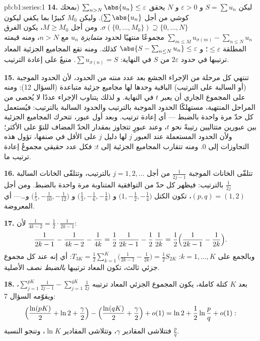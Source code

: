 \begin{solution}{pb:b1:series:1}
\textbf{14.} ليكن $S = \sum u_n$ و $\varepsilon > 0$ و $N$ يحقق
$\sum_{n > N} \abs{u_n} \leq \varepsilon$ (بمحك كوشي من أجل
$\sum\abs{u_n}$). وليكن $M_0$ كبيرًا بما يكفي ليكون $\sigma(\{0,
\dots, M_0\}) \supseteq \{0, \dots, N\}$. ومن أجل $M \geq M_0$، يكون
الفرق $\sum_{m \leq M} u_{\sigma(m)} - \sum_{n \leq N} u_n$
مجموعًا منتهيًا لحدود \emph{متمايزة} $u_n$ مع $n > N$،
ومنه قيمته المطلقة $\leq \varepsilon$؛ و $\abs{S -
\sum_{n\leq N} u_n} \leq \varepsilon$ كذلك. ومنه تقع المجاميع الجزئية
المعاد ترتيبها في حدود $2\varepsilon$ من $S$ في النهاية:
$\sum u_{\sigma(n)} = S$. 
منيعٌ على إعادة الترتيب.

\textbf{15.} تنتهي كل مرحلة من الإجراء الجشع بعد
عدد منته من الحدود، لأن الحدود الموجبة (أو السالبة على
الترتيب) الباقية وحدها لها مجاميع جزئية متباعدة
(السؤال 12): ومنه على المجموع الجاري أن يعبر $t$ في النهاية. و
لذلك يتناوب الإجراء عددًا لا يُحصى من المراحل المنتهية،
مستهلكًا الحدود الموجبة بالترتيب والحدود السالبة
بالترتيب: فيُستعمل كل حدّ مرة واحدة بالضبط --- أي إعادة ترتيب.
وبعد أول عبور، تتحرك المجاميع الجزئية بين عبورين متتاليين
رتيبةً نحو $t$، وعند عبورٍ
تتجاوز بمقدار الحدّ المضاف للتوّ على الأكثر؛ ولأن الحدود
المستعملة عند العبور $j$ لها دليل $j$ على الأقل في
صنفها، تؤول هذه التجاوزات إلى $0$. ومنه تتقارب المجاميع الجزئية
إلى $t$: فكل عدد حقيقي مجموعُ إعادة ترتيب
ما.

\textbf{16.} تتلقّى الخانات الموجبة $\frac{1}{2j-1}$ من أجل
$j = 1, 2, \dots$ بالترتيب، وتتلقّى الخانات السالبة $\frac{1}{2j}$
بالترتيب: فيظهر كل حدّ من  التوافقية المتناوبة
مرة واحدة بالضبط. ومن أجل $(p, q) = (1, 2)$، تكون الكتل
$\bigl(1, -\frac12, -\frac14\bigr)$ و $\bigl(\frac13, -\frac16,
-\frac18\bigr)$ و $\bigl(\frac15, -\frac1{10},
-\frac1{12}\bigr)$ و\dots --- أي  المعروضة.

\textbf{17.} لأن $\frac{1}{4k-2} = \frac12\cdot\frac{1}{2k-1}$:
\[
\frac{1}{2k-1} - \frac{1}{4k-2} - \frac{1}{4k}
= \frac12\,\frac{1}{2k-1} - \frac12\,\frac{1}{2k}
= \frac12\Bigl(\frac{1}{2k-1} - \frac{1}{2k}\Bigr).
\]
وبالجمع على $k = 1, \dots, K$: $T_{3K} = \frac12
\sum_{k=1}^{K}\bigl(\frac{1}{2k-1} - \frac{1}{2k}\bigr) =
\frac12 S_{2K}$: أي إنه عند كل مجموع جزئي ثالث، تكون 
المعاد ترتيبها \emph{بالضبط} نصف الأصلية.

\textbf{18.} بعد $K$ كتلة كاملة، يكون المجموع الجزئي
المعاد ترتيبه $\sum_{j=1}^{pK}\frac{1}{2j-1} -
\sum_{j=1}^{qK}\frac{1}{2j}$، ويقوّمه السؤال 7:
\[
\Bigl(\frac{\ln(pK)}{2} + \ln 2 + \frac\gamma2\Bigr)
- \Bigl(\frac{\ln(qK)}{2} + \frac\gamma2\Bigr) + o(1)
= \ln 2 + \frac12\ln\frac pq + o(1) :
\]
فتتلاشى المقادير $\gamma$، وتتلاشى المقادير $\ln K$، وتنجو النسبة
$\frac pq$.


\end{solution}
